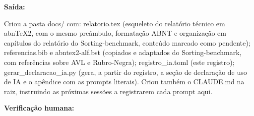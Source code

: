 \textbf{Saída:}
\begin{registroia}
Criou a pasta docs/ com: relatorio.tex (esqueleto do relatório técnico em abnTeX2, com o mesmo preâmbulo, formatação ABNT e organização em capítulos do relatório do Sorting-benchmark, conteúdo marcado como pendente); referencias.bib e abntex2-alf.bst (copiados e adaptados do Sorting-benchmark, com referências sobre AVL e Rubro-Negra); registro\_ia.toml (este registro); gerar\_declaracao\_ia.py (gera, a partir do registro, a seção de declaração de uso de IA e o apêndice com as prompts literais). Criou também o CLAUDE.md na raiz, instruindo as próximas sessões a registrarem cada prompt aqui.
\end{registroia}
\textbf{Verificação humana:} 
